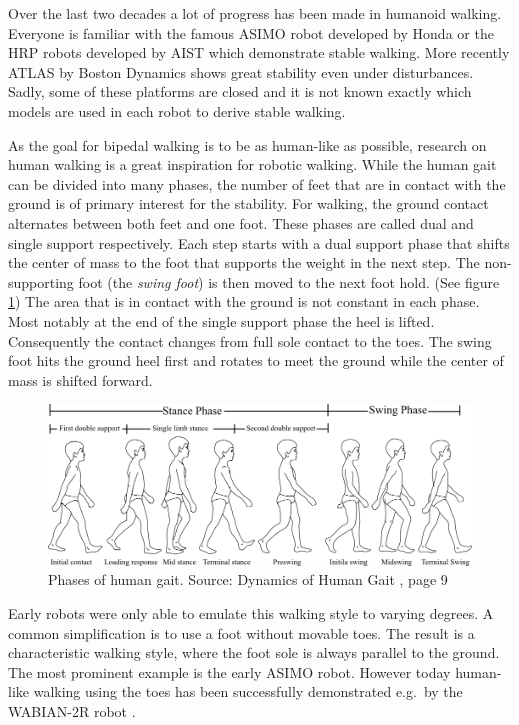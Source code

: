 \documentclass[english,ngerman]{KITreprt}
\newcommand{\name}[1]{\textsc{#1}}
\begin{document}
Over the last two decades a lot of progress has been made in humanoid
walking. Everyone is familiar with the famous \name{ASIMO} robot
developed by Honda or the \name{HRP} robots developed by \name{AIST}
which demonstrate stable walking. More recently \name{ATLAS} by Boston
Dynamics shows great stability even under disturbances. Sadly, some of
these platforms are closed and it is not known exactly which models are
used in each robot to derive stable walking.

As the goal for bipedal walking is to be as human-like as possible,
research on human walking is a great inspiration for robotic walking.
While the human gait can be divided into many phases, the number of feet
that are in contact with the ground is of primary interest for the
stability. For walking, the ground contact alternates between both feet
and one foot. These phases are called dual and single support
respectively. Each step starts with a dual support phase that shifts the
center of mass to the foot that supports the weight in the next step.
The non-supporting foot (the \emph{swing foot}) is then moved to the
next foot hold. (See figure \ref{img:human-gait}) The area that is in
contact with the ground is not constant in each phase. Most notably at
the end of the single support phase the heel is lifted. Consequently the
contact changes from full sole contact to the toes. The swing foot hits
the ground heel first and rotates to meet the ground while the center of
mass is shifted forward.

\begin{figure}[tb]
\vspace*{-1em}
\includegraphics[width=\textwidth]{images/human_gait.png}
\caption{Phases of human gait. Source: Dynamics of Human Gait \cite{vaughan1992dynamics}, page 9}
\label{img:human-gait}
\end{figure}

Early robots were only able to emulate this walking style to varying
degrees. A common simplification is to use a foot without movable toes.
The result is a characteristic walking style, where the foot sole is
always parallel to the ground. The most prominent example is the early
\name{ASIMO} robot. However today human-like walking using the toes has
been successfully demonstrated e.g.~by the \name{WABIAN-2R} robot
\cite{ogura2006human}.
\end{document}
